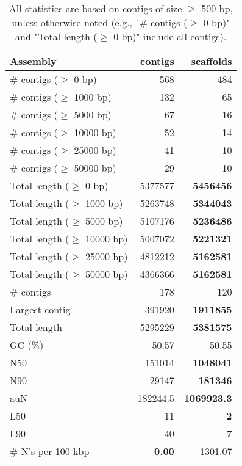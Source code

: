 \documentclass[12pt,a4paper]{article}
\begin{document}
\begin{table}[ht]
\begin{center}
\caption{All statistics are based on contigs of size $\geq$ 500 bp, unless otherwise noted (e.g., "\# contigs ($\geq$ 0 bp)" and "Total length ($\geq$ 0 bp)" include all contigs).}
\begin{tabular}{|l*{2}{|r}|}
\hline
Assembly & contigs & scaffolds \\ \hline
\# contigs ($\geq$ 0 bp) & 568 & 484 \\ \hline
\# contigs ($\geq$ 1000 bp) & 132 & 65 \\ \hline
\# contigs ($\geq$ 5000 bp) & 67 & 16 \\ \hline
\# contigs ($\geq$ 10000 bp) & 52 & 14 \\ \hline
\# contigs ($\geq$ 25000 bp) & 41 & 10 \\ \hline
\# contigs ($\geq$ 50000 bp) & 29 & 10 \\ \hline
Total length ($\geq$ 0 bp) & 5377577 & {\bf 5456456} \\ \hline
Total length ($\geq$ 1000 bp) & 5263748 & {\bf 5344043} \\ \hline
Total length ($\geq$ 5000 bp) & 5107176 & {\bf 5236486} \\ \hline
Total length ($\geq$ 10000 bp) & 5007072 & {\bf 5221321} \\ \hline
Total length ($\geq$ 25000 bp) & 4812212 & {\bf 5162581} \\ \hline
Total length ($\geq$ 50000 bp) & 4366366 & {\bf 5162581} \\ \hline
\# contigs & 178 & 120 \\ \hline
Largest contig & 391920 & {\bf 1911855} \\ \hline
Total length & 5295229 & {\bf 5381575} \\ \hline
GC (\%) & 50.57 & 50.55 \\ \hline
N50 & 151014 & {\bf 1048041} \\ \hline
N90 & 29147 & {\bf 181346} \\ \hline
auN & 182244.5 & {\bf 1069923.3} \\ \hline
L50 & 11 & {\bf 2} \\ \hline
L90 & 40 & {\bf 7} \\ \hline
\# N's per 100 kbp & {\bf 0.00} & 1301.07 \\ \hline
\end{tabular}
\end{center}
\end{table}
\end{document}
